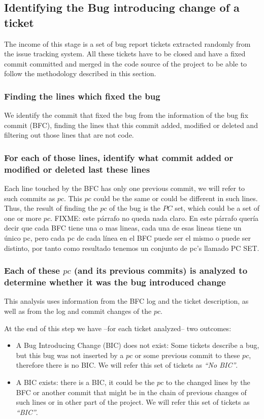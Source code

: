 \documentclass[conference]{IEEEtran}
\begin{document}
\subsection{Identifying the Bug introducing change of a ticket}
\label{sec:methodologySS}

The income of this stage is a set of bug report tickets extracted randomly from the issue tracking system.
All these tickets have to be closed and have a fixed commit committed and merged in the code source of the project to be able to follow the methodology described in this section.

\subsubsection{Finding the lines which fixed the bug}

We identify the commit that fixed the bug from the information of the bug fix commit (BFC), finding the lines that this commit added, modified or deleted and filtering out those lines that are not code.
	
\subsubsection{For each of those lines, identify what commit added or modified or deleted last these lines}

Each line touched by the BFC has only one previous commit, we will refer to such commits as $pc$.
This $pc$ could be the same or could be different in such lines. Thus, the result of finding the $pc$ of the bug is the $PC$ set, which could be a set of one or more $pc$. FIXME: este párrafo no queda nada claro. En este párrafo quería decir que cada BFC tiene una o mas lineas, cada una de esas lineas tiene un único pc, pero cada pc de cada línea en el BFC puede ser el mismo o puede ser distinto, por tanto como resultado tenemos un conjunto de pc's llamado PC SET.

\subsubsection{Each of these $pc$ (and its previous commits) is analyzed to determine whether it was the bug introduced change}

This analysis uses information from the BFC log and the ticket description, as well as from the log and commit changes of the $pc$.

At the end of this step we have --for each ticket analyzed-- two outcomes:
\begin{itemize}
	\item A Bug Introducing Change (BIC) does not exist: Some tickets describe a bug, but this bug was not inserted by a $pc$ or some previous commit to these $pc$, therefore there is no BIC. We will refer this set of tickets as \textit{``No BIC''}.
	\item A BIC exists: there is a BIC, it could be the $pc$ to the changed lines by the BFC or another commit that might be in the chain of previous changes of such lines or in other part of the project. We will refer this set of tickets as \textit{``BIC''}. 
\end{itemize}
\end{document}
